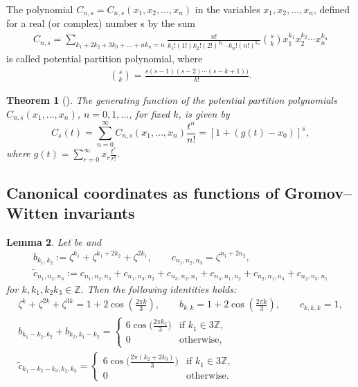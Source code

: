 \documentclass[11pt]{article}
\numberwithin{equation}{section}
\numberwithin{equation}{section}
\newtheorem{Theorem}{Theorem}[section]
\newtheorem{Lemma}[Theorem]{Lemma}
\begin{document}
\begin{Definition}
The polynomial $C_{n,s}=C_{n,s}(x_1,x_2,\dots,x_n)$ in the variables $x_1,x_2,\dots,\allowbreak x_n$, defined for a real (or complex) number s by the sum
\begin{gather*}
C_{n,s}=\sum_{ k_1+2k_2+3k_3+\dots +nk_{n}=n} \frac{n!}{k_1!(1!)k_2!(2!)^{k_2}\cdots k_n!(n!)^{k_n}}{{s}\choose{k}} x_1^{k_1}x_2^{k_2}\cdots x_n^{k_n}
\end{gather*}
 is called potential partition polynomial,
 where
 \begin{gather*}
 {{s}\choose{k}}=\frac{s(s-1)(s-2)\cdots (s-k+1))}{k!}.
 \end{gather*}
\end{Definition}


\begin{Theorem}[\cite{Charalambides}]\label{theorem potential partition polynomials}
The generating function of the potential partition polynomials $C_{n,s}(x_1,\dots,\allowbreak x_n)$, $n=0,1,\dots$, for fixed $k$, is given by
 \[%
C_{s}(t)=\sum_{n=0}^{\infty} C_{n,s}(x_1,\dots, x_n)\frac{t^n}{n!}=[ 1+(g(t)-x_0) ]^s ,
\]
where
$g(t)=\sum_{r=0}^{\infty} x_r \frac{t^r}{r!}$.
\end{Theorem}

\subsection{Canonical coordinates as functions of Gromov--Witten invariants}\label{Canonical coordinates as functions of Gromov Witten invariants}

\begin{Lemma}\label{lemma of exp 2pi 3}
Let be  and
\begin{gather*}
b_{k_1,k_2}:=\zeta^{k_1}+\zeta^{k_1+2k_2}+\zeta^{2k_1},\qquad
c_{n_1,n_2,n_3}=\zeta^{n_1+2n_2},\\
\tilde c_{n_1,n_2,n_3}:=c_{n_1,n_2,n_3}+c_{n_1,n_3,n_2}+c_{n_3,n_2,n_1}+c_{n_3,n_1,n_2}+c_{n_2,n_1,n_3}+c_{n_2,n_3,n_1}
\end{gather*}
for $k,k_1,k_2 k_3 \in \mathbb{Z}$. Then the following identities holds:
\begin{gather}
\zeta^{k}+\zeta^{2k}+\zeta^{3k}=1+2\cos\left(\frac{2\pi k}{3} \right),\qquad
b_{k,k}=1+2\cos\left(\frac{2\pi k}{3} \right),\qquad
c_{k,k,k}=1,
\nonumber\\
 b_{k_1-k_2,k_2}+b_{k_2,k_1-k_2}=
\begin{cases}
 6\cos\bigl( \frac{2\pi k_2}{3}\bigr)& \text{if } k_1\in 3\mathbb{Z},\\
 0 & \text{otherwise},
\end{cases}\nonumber
\\
\tilde c_{k_1-k_2-k_3,k_2,k_3}=
\begin{cases}
 6\cos\bigl( \frac{2\pi (k_2+2k_3)}{3}\bigr)& \text{if } k_1\in 3\mathbb{Z},\\
 0 & \text{otherwise}.
\end{cases}\label{exp 2pi 3 id}
\end{gather}
\end{Lemma}
\end{document}

